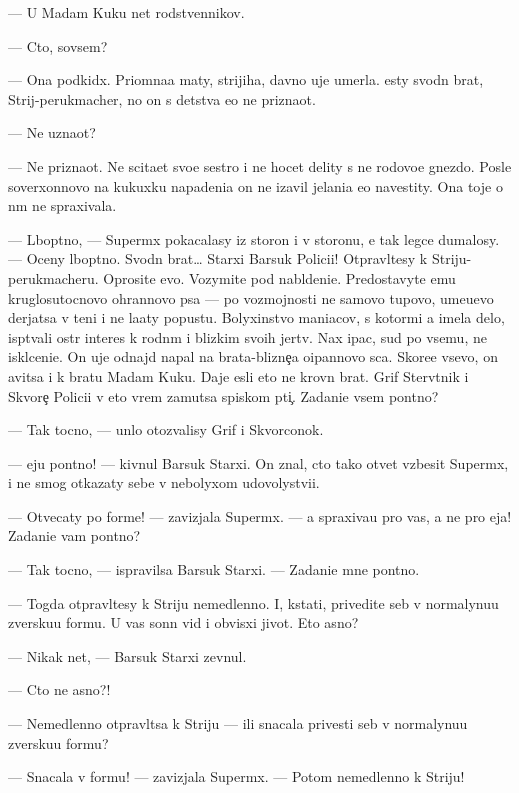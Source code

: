 \documentclass[12pt]{book}
\begin{document}
— U Madam Kuku net rodstvennikov.

— Cto, sovsem?

— Ona podkid{\yi}x. Pri{\y}omna{\y}a maty, strijiha, davno uje umerla. {\Y}esty svodn{\yi}{\y} brat, Strij-perukmacher, no on s detstva {\y}e{\y}o ne prizna{\y}ot.

— Ne uzna{\y}ot?

— Ne prizna{\y}ot. Ne scita{\y}et svo{\y}e{\y} sestro{\y} i ne hocet delity s ne{\y} rodovo{\y}e gnezdo. Posle soverxonnovo na kukuxku napadeni{\y}a on ne iz{\y}avil jelani{\y}a {\y}e{\y}o navestity. Ona toje o n{\e}m ne spraxivala.

— L{\io}bop{\yi}tno, — Superm{\yi}x pokacalasy iz storon{\yi} i v storonu, {\y}e{\y} tak legce dumalosy. — Oceny l{\io}bop{\yi}tno. Svodn{\yi}{\y} brat… Starxi{\y} Barsuk Polici{\y}i! Otpravl{\ia}{\y}tesy k Striju-perukmacheru. Oprosite {\y}evo. Vozymite pod nabl{\io}deni{\y}e. Predostavyte {\y}emu kruglosutocnovo ohrannovo psa — po vozmojnosti ne samovo tupovo, ume{\y}u{\x}evo derjatsa v teni i ne la{\y}aty popustu. Bolyxinstvo maniacov, s kotor{\yi}mi {\y}a imela delo, isp{\yi}t{\yi}vali ostr{\yi}{\y} interes k rodn{\yi}m i blizkim svo{\y}ih jertv. Nax {\X}ipac, sud{\ia} po vsemu, ne iskl{\io}ceni{\y}e. On uje odnajd{\yi} napal na brata-blizne{\c}a o{\x}ipannovo s{\yi}ca. Skore{\y}e vsevo, on {\y}avitsa i k bratu Madam Kuku. Daje {\y}esli eto ne krovn{\yi}{\y} brat. Grif Sterv{\ia}tnik i Skvore{\c} Polici{\y}i v eto vrem{\ia} za{\y}mutsa spiskom pti{\c}. Zadani{\y}e vsem pon{\ia}tno?

— Tak tocno, — un{\yi}lo otozvalisy Grif i Skvorconok.

— {\Y}eju pon{\ia}tno! — kivnul Barsuk Starxi{\y}. On znal, cto tako{\y} otvet vzbesit Superm{\yi}x, i ne smog otkazaty sebe v nebolyxom udovolystvi{\y}i.

— Otvecaty po forme! — zavizjala Superm{\yi}x. — {\Y}a spraxiva{\y}u pro vas, a ne pro {\y}eja! Zadani{\y}e vam pon{\ia}tno?

— Tak tocno, — ispravilsa Barsuk Starxi{\y}. — Zadani{\y}e mne pon{\ia}tno.

— Togda otpravl{\ia}{\y}tesy k Striju nemedlenno. I, kstati, privedite seb{\ia} v normalynu{\y}u zversku{\y}u formu. U vas sonn{\yi}{\y} vid i obvisxi{\y} jivot. Eto {\y}asno?

— Nikak net, — Barsuk Starxi{\y} zevnul.

— Cto ne {\y}asno?!

— Nemedlenno otpravl{\ia}tsa k Striju — ili snacala privesti seb{\ia} v normalynu{\y}u zversku{\y}u formu?

— Snacala v formu! — zavizjala Superm{\yi}x. — Potom nemedlenno k Striju!
\end{document}
